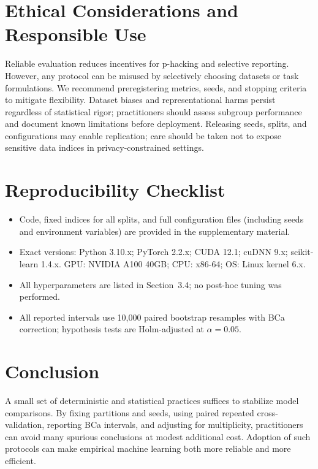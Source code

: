 \documentclass[11pt]{article}
\begin{document}
\section{Ethical Considerations and Responsible Use}
Reliable evaluation reduces incentives for p-hacking and selective reporting. However, any protocol can be misused by selectively choosing datasets or task formulations. We recommend preregistering metrics, seeds, and stopping criteria to mitigate flexibility. Dataset biases and representational harms persist regardless of statistical rigor; practitioners should assess subgroup performance and document known limitations before deployment. Releasing seeds, splits, and configurations may enable replication; care should be taken not to expose sensitive data indices in privacy-constrained settings.

\section{Reproducibility Checklist}
\begin{itemize}
  \item Code, fixed indices for all splits, and full configuration files (including seeds and environment variables) are provided in the supplementary material.
  \item Exact versions: Python 3.10.x; PyTorch 2.2.x; CUDA 12.1; cuDNN 9.x; scikit-learn 1.4.x. GPU: NVIDIA A100 40GB; CPU: x86-64; OS: Linux kernel 6.x.
  \item All hyperparameters are listed in Section~3.4; no post-hoc tuning was performed.
  \item All reported intervals use 10,000 paired bootstrap resamples with BCa correction; hypothesis tests are Holm-adjusted at $\alpha=0.05$.
\end{itemize}

\section{Conclusion}
A small set of deterministic and statistical practices suffices to stabilize model comparisons. By fixing partitions and seeds, using paired repeated cross-validation, reporting BCa intervals, and adjusting for multiplicity, practitioners can avoid many spurious conclusions at modest additional cost. Adoption of such protocols can make empirical machine learning both more reliable and more efficient.
\end{document}
